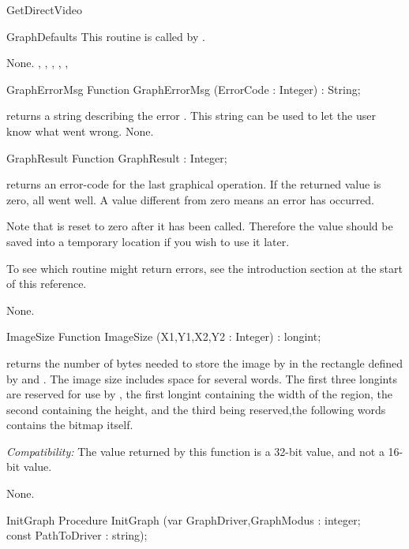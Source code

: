 \begin{function}{GetDirectVideo}
\begin{procedure}{GraphDefaults}
This routine is called by .

\Errors
None.
\SeeAlso
{}, , ,
, , 
\end{procedure}

\begin{function}{GraphErrorMsg}
\Declaration
Function GraphErrorMsg (ErrorCode : Integer) : String;

\Description
{}
returns a string describing the error . This string can be
used to let the user know what went wrong.
\Errors
None.
\SeeAlso
{}
\end{function}
\begin{function}{GraphResult}
\Declaration
Function GraphResult  : Integer;

\Description
{} returns an error-code for
the last graphical operation. If the returned value is zero, all went well.
A value different from zero means an error has occurred.

Note that  is reset to zero after it has been called.
Therefore the value should be saved into a temporary location if you wish
to use it later.

To see which routine might return errors, see the introduction section at
the start of this reference.

\Errors
None.
\SeeAlso
{}
\end{function}

\begin{function}{ImageSize}
\Declaration
Function ImageSize (X1,Y1,X2,Y2 : Integer) : longint;

\Description
{} returns the number of bytes needed to store the image
by  in the rectangle defined by  and .
The image size includes space for several words. The first three longints
are reserved for use by , the first longint containing the
width of the region, the second containing the height, and the third being
reserved,the following words contains the bitmap itself.

\textit{Compatibility:}
 The value returned by this function is a 32-bit value,
 and not a 16-bit value.

\Errors
None.
\SeeAlso
{}
\end{function}

\begin{procedure}{InitGraph}
\Declaration
Procedure InitGraph (var GraphDriver,GraphModus : integer;\\
const PathToDriver : string);


\end{procedure}
\end{function}
